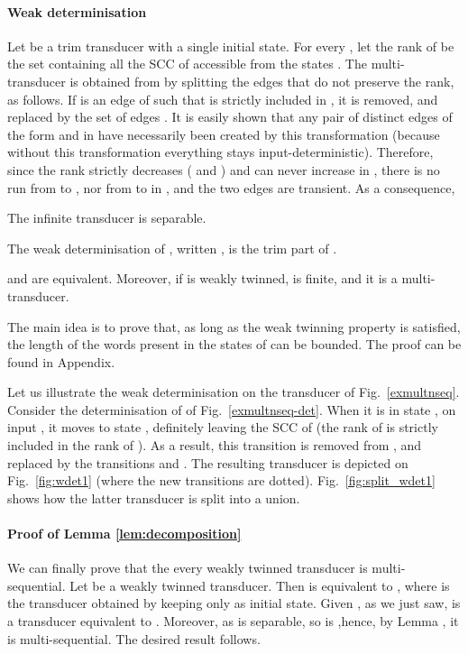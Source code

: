 \documentclass[envcountsame]{llncs}
\begin{document}
\paragraph{\textbf{Weak determinisation}} Let  be a trim transducer with a single initial state.
For every , let the rank 
of  be the set containing all the SCC of  accessible from the
states . The multi-transducer  is obtained from  by splitting the edges that do not preserve the rank, as follows.
If  is an edge of  such that
 is strictly included in , it is removed, and replaced
by the set of edges . It is easily shown that any pair of distinct edges of the form 
 and  in  have necessarily been
created by this transformation (because without this transformation
everything stays input-deterministic). Therefore, since the rank
strictly decreases ( and ) and can never increase in , there is no
run from  to , nor from  to  in
, and the two edges are transient. As a
consequence, 

\begin{lemma}\label{lem:separable}
The infinite transducer  is separable.
\end{lemma}


The weak determinisation of , written , is the trim part of .


\begin{proposition}\label{weakdet}
 and  are equivalent. Moreover, 
if  is weakly twinned,  is finite, and it
is a multi-transducer.
\end{proposition}

The main idea is to prove that, as long as the weak twinning property
is satisfied, the length of the words present in the states of
 can be bounded. The proof can be found in
Appendix. 


\begin{example}
Let us illustrate the weak determinisation on the transducer  of
Fig.~\ref{exmultnseq}. Consider the determinisation
 of  of Fig.~\ref{exmultnseq-det}.
When it is in state , on input , it moves to
state , definitely leaving the SCC
 of  (the rank  of  is
strictly included in the rank  of ). As a result, this
transition is removed from , and replaced by the
transitions  and
. The resulting transducer
 is depicted on Fig.~\ref{fig:wdet1} (where the new
transitions are dotted). Fig.~\ref{fig:split_wdet1} shows how the
latter transducer is split into a union.
\end{example}




\paragraph{Proof of Lemma \ref{lem:decomposition}} We can finally prove that the every weakly twinned transducer is multi-sequential.
Let  be a weakly twinned transducer.
Then  is equivalent to , where  is the transducer obtained by keeping only  as initial state.
Given , as we just saw,  is a transducer equivalent to .
Moreover, as  is separable, so is ,hence, by Lemma , it is multi-sequential.
The desired result follows.
\end{document}
